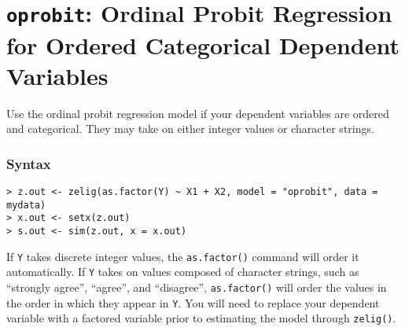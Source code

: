 




\section{{\tt oprobit}: Ordinal Probit Regression for Ordered
Categorical Dependent Variables}\label{oprobit}

Use the ordinal probit regression model if your dependent variables
are ordered and categorical.  They may take on either integer values
or character strings.  

\subsubsection{Syntax}

\begin{verbatim}
> z.out <- zelig(as.factor(Y) ~ X1 + X2, model = "oprobit", data = mydata)
> x.out <- setx(z.out)
> s.out <- sim(z.out, x = x.out)
\end{verbatim}
If {\tt Y} takes discrete integer values, the {\tt as.factor()}
command will order it automatically.  If {\tt Y} takes on values
composed of character strings, such as ``strongly agree'', ``agree'',
and ``disagree'', {\tt as.factor()} will order the values in the order
in which they appear in {\tt Y}.  You will need to replace your
dependent variable with a factored variable prior to estimating the
model through {\tt zelig()}.
